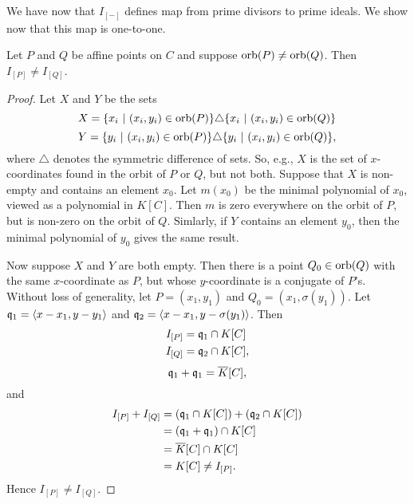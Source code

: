 We have now that $I_{[-]}$ defines map from prime divisors to prime ideals.
We show now that this map is one-to-one.
\begin{proposition}
  Let $P$ and $Q$ be affine points on $C$ and suppose $\orb(P) \neq \orb(Q)$.
  Then $I_{[P]} \neq I_{[Q]}$.
\end{proposition}
\begin{proof}
  Let $X$ and $Y$ be the sets
    \[ X = \{ x_i ~|~ (x_i, y_i) \in \orb(P) \} \triangle \{ x_i ~|~ (x_i, y_i) \in \orb(Q) \} \]
    \[ Y = \{ y_i ~|~ (x_i, y_i) \in \orb(P) \} \triangle \{ y_i ~|~ (x_i, y_i) \in \orb(Q) \}, \]
    where $\triangle$ denotes the symmetric difference of sets.
  So, e.g., $X$ is the set of $x$-coordinates found in the orbit of $P$ or $Q$, but not both.
  Suppose that $X$ is non-empty and contains an element $x_0$.
  Let $m(x_0)$ be the minimal polynomial of $x_0$, viewed as a polynomial in $K[C]$.
  Then $m$ is zero everywhere on the orbit of $P$, but is non-zero on the orbit of $Q$.
  Simlarly, if $Y$ contains an element $y_0$, then the minimal polynomial of $y_0$ gives the same result.

  Now suppose $X$ and $Y$ are both empty.
  Then there is a point $Q_0 \in \orb(Q)$ with the same $x$-coordinate as $P$, but whose $y$-coordinate is a conjugate of $P$'s.
  Without loss of generality, let $P = (x_1, y_1)$ and $Q_0 = (x_1, \sigma(y_1))$.
  Let $\frak q_1 = \pid{x - x_1, y - y_1}$ and $\frak q_2 = \pid{x - x_1, y - \sigma(y_1)}$. Then
  \begin{align*}
    I_{[P]} &= \frak q_1 \cap K[C] \\
    I_{[Q]} &= \frak q_2 \cap K[C],
  \end{align*}
  \[ \frak q_1 + \frak q_1 = \bar K[C], \]
  and
  \begin{align*}
    I_{[P]} + I_{[Q]}
      &= (\frak q_1 \cap K[C]) + (\frak q_2 \cap K[C]) \\
      &= (\frak q_1  + \frak q_1) \cap K[C] \\
      &= \bar K[C] \cap K[C] \\
      &= K[C] \neq I_{[P]}.
  \end{align*}
  Hence $I_{[P]} \neq I_{[Q]}$.
\end{proof}

